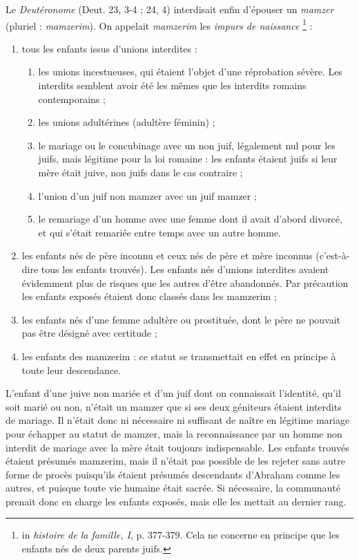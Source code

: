  Le \emph{Deutéronome} (Deut. 23, 3-4 ; 24, 4) interdisait enfin d'épouser un \emph{mamzer} (pluriel : \emph{mamzerim}). On appelait \emph{mamzerim} les \emph{impurs de naissance}%
\footnote{in \emph{histoire de la famille, I}, p. 377-379. Cela ne concerne en principe que les enfants nés de deux parents juifs.}%
 :
\begin{enumerate}
\item tous les enfants issus d'unions interdites :
 \begin{enumerate}
 \item les unions incestueuses, qui étaient l'objet d'une réprobation sévère. Les interdits semblent avoir été les mêmes que les interdits romains contemporains ;
 \item les unions adultérines (adultère féminin) ;
 \item le mariage ou le concubinage avec un non juif, légalement nul pour les juifs, mais légitime pour la loi romaine : les enfants étaient juifs si leur mère était juive, non juifs dans le cas contraire ;
 \item l'union d'un juif non mamzer avec un juif mamzer ;
 \item le remariage d'un homme avec une femme dont il avait d'abord divorcé, et qui s'était remariée entre temps avec un autre homme.
\end{enumerate}
\item les enfants nés de père inconnu et ceux nés de père et mère inconnus (c'est-à-dire tous les enfants trouvés). Les enfants nés d'unions interdites avaient évidemment plus de risques que les autres d'être abandonnés. Par précaution les enfants exposés étaient donc classés dans les mamzerim ;
\item les enfants nés d'une femme adultère ou prostituée, dont le père ne pouvait pas être désigné avec certitude ;
\item les enfants des mamzerim : ce statut se transmettait en effet en principe à toute leur descendance. 
\end{enumerate}

 L'enfant d'une juive non mariée et d'un juif dont on connaissait l'identité, qu'il soit marié ou non, n'était un mamzer que si ses deux géniteurs étaient interdits de mariage. Il n'était donc ni nécessaire ni suffisant de naître en légitime mariage pour échapper au statut de mamzer, mais la reconnaissance par un homme non interdit de mariage avec la mère était toujours indispensable. Les enfants trouvés étaient présumés mamzerim, mais il n'était pas possible de les rejeter sans autre forme de procès puisqu'ils étaient présumés descendants d'Abraham comme les autres, et puisque toute vie humaine était sacrée. Si nécessaire, la communauté prenait donc en charge les enfants exposés, mais elle les mettait au dernier rang.

